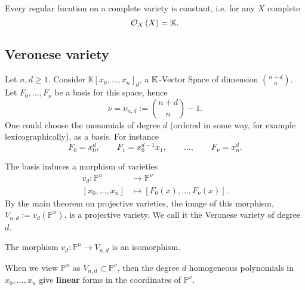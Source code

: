 \begin{cor}
	Every regular fucntion on a complete variety is constant, i.e. for any $X$ complete
	\begin{equation}
	\mathcal{O}_{X} \left( X \right) = \mathbb{K}
	.\end{equation} 
\end{cor} 

\subsection{Veronese variety}

Let $n, d \geq 1$.
Consider $\mathbb{K}\left[x_0, \ldots, x_n \right]_d$, a $\mathbb{K}$-Vector Space of dimension $\binom{n+d}{n}$.
Let $F_0, \ldots, F_\nu$ be a basis for this space, hence
\begin{equation}
	\nu = \nu_{n,d} := \binom{n+d}{n} - 1
.\end{equation} 
One could choose the monomials of degree $d$ (ordered in some way, for example lexicographically), as a basis.
For instance
\begin{equation}
F_0 = x_0^d, \qquad
F_1 = x_0^{d-1} x_1,\qquad \ldots,\qquad
F_{\nu} = x_n^d
.\end{equation} 

The basis induces a morphism of varieties
\begin{align}
	v_d: \mathbb{P}^{n} &\to \mathbb{P}^{\nu} \\
	\left[ x_0 , \ldots , x_n \right] &\mapsto \left[ F_0(x) , \ldots , F_\nu(x) \right]
.\end{align} 
By the main theorem on projective varieties, the image of this morphism, $V_{n,d} := v_d \left( \mathbb{P}^{n} \right)$, is a projective variety.
We call it the Veronese variety of degree $d$.

\begin{prop}
	The morphism $v_d: \mathbb{P}^{n} \to V_{n,d}$ is an isomorphism.
\end{prop} 
\begin{rem}
	When we view $\mathbb{P}^{n}$ as $V_{n,d} \subset \mathbb{P}^{\nu}$, then the degree $d$ 
	homogeneous polynomials in $x_0, \ldots, x_n$ give \textbf{linear} forms in the coordinates of $\mathbb{P}^{\nu}$.
\end{rem} 

